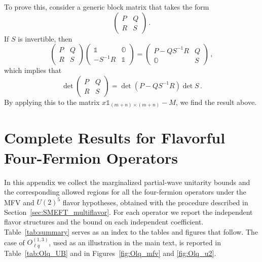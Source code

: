 \begin{subappendices}
To prove this, consider a generic block matrix that takes the form
\begin{equation}
    \begin{pmatrix}
        P & Q \\ R & S
    \end{pmatrix}\,.
\end{equation}
If $S$ is invertible, then
\begin{equation}
    \begin{pmatrix}
        P & Q \\ R & S
    \end{pmatrix}
    \begin{pmatrix} \mathbb{1} & \mathbb{O} \\ -S^{-1}R & \mathbb{1} 
    \end{pmatrix}
    =
    \begin{pmatrix} P-QS^{-1}R & Q \\ \mathbb{O} & S 
    \end{pmatrix}\,,
\end{equation}
which implies that 
\begin{equation}
    \det\begin{pmatrix} P & Q \\ R & S \end{pmatrix}=\det(P-QS^{-1}R) \det S \,.
\end{equation}
By applying this to the matrix $x\mathbb{1}_{(m+n)\times(m+n)}-M$, we find the result above.

\section{Complete Results for Flavorful Four-Fermion Operators\label{app:SMEFT_flavorresults}}

In this appendix we collect the marginalized partial-wave unitarity bounds and the corresponding
allowed regions for all the four-fermion operators under the MFV and $U(2)^5$ flavor hypotheses,
obtained with the procedure described in Section~\ref{sec:SMEFT_multiflavor}. For each operator we
report the independent flavor structures and the bound on each independent coefficient.
Table~\ref{tab:summary} serves as an index to the tables and figures that follow. The case of
$O_{\ell q}^{(1,3)}$, used as an illustration in the main text, is reported in
Table~\ref{tab:Olq_UB} and in Figures~\ref{fig:Olq_mfv} and \ref{fig:Olq_u2}.







\end{subappendices}